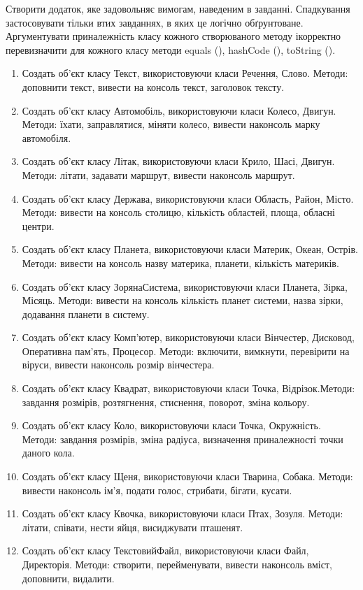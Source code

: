 \documentclass[]{article}
\begin{document}
Створити додаток, яке задовольняє вимогам, наведеним в завданні. Спадкування застосовувати тільки втих завданнях, в яких це логічно обґрунтоване. Аргументувати приналежність класу кожного створюваного методу ікорректно перевизначити для кожного класу методи equals (), hashCode (), toString ().
\begin{enumerate}
\def\labelenumi{5.\arabic{enumi}.}
\item
Создать об'єкт класу Текст, використовуючи класи Речення, Слово. Методи: доповнити текст, вивести на консоль текст, заголовок тексту.
\item
Создать об'єкт класу Автомобіль, використовуючи класи Колесо, Двигун. Методи: їхати, заправлятися, міняти колесо, вивести наконсоль марку автомобіля.
\item
Создать об'єкт класу Літак, використовуючи класи Крило, Шасі, Двигун. Методи: літати, задавати маршрут, вивести наконсоль маршрут.
\item
Создать об'єкт класу Держава, використовуючи класи Область, Район, Місто. Методи: вивести на консоль столицю, кількість областей, площа, обласні центри.
\item
Создать об'єкт класу Планета, використовуючи класи Материк, Океан, Острів. Методи: вивести на консоль назву материка, планети, кількість материків.
\item
Создать об'єкт класу ЗорянаСистема, використовуючи класи Планета, Зірка, Місяць. Методи: вивести на консоль кількість планет системи, назва зірки, додавання планети в систему.
\item
Создать об'єкт класу Комп'ютер, використовуючи класи Вінчестер, Дисковод, Оперативна пам'ять, Процесор. Методи: включити, вимкнути, перевірити на віруси, вивести наконсоль розмір вінчестера.
\item
Создать об'єкт класу Квадрат, використовуючи класи Точка, Відрізок.Методи: завдання розмірів, розтягнення, стиснення, поворот, зміна кольору.
\item
Создать об'єкт класу Коло, використовуючи класи Точка, Окружність. Методи: завдання розмірів, зміна радіуса, визначення приналежності точки даного кола.
\item
Создать об'єкт класу Щеня, використовуючи класи Тварина, Собака. Методи: вивести наконсоль ім'я, подати голос, стрибати, бігати, кусати.
\item
Создать об'єкт класу Квочка, використовуючи класи Птах, Зозуля. Методи: літати, співати, нести яйця, висиджувати пташенят.
\item
Создать об'єкт класу ТекстовийФайл, використовуючи класи Файл, Директорія. Методи: створити, перейменувати, вивести наконсоль вміст, доповнити, видалити.

\end{enumerate}
\end{document}
